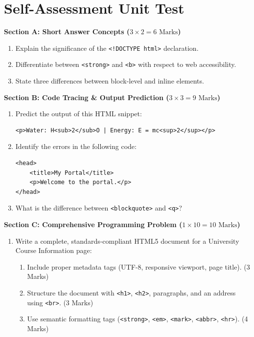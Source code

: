 \section{Self-Assessment Unit Test}

\begin{chaptertest}
\noindent\textbf{Section A: Short Answer Concepts ($3 \times 2 = 6\text{ Marks}$)}
\begin{enumerate}
    \item Explain the significance of the \texttt{<!DOCTYPE html>} declaration.
    \item Differentiate between \texttt{<strong>} and \texttt{<b>} with respect to web accessibility.
    \item State three differences between block-level and inline elements.
\end{enumerate}

\medskip
\noindent\textbf{Section B: Code Tracing \& Output Prediction ($3 \times 3 = 9\text{ Marks}$)}
\begin{enumerate}[start=4]
    \item Predict the output of this HTML snippet:
    \begin{lstlisting}[language=HTML5]
<p>Water: H<sub>2</sub>O | Energy: E = mc<sup>2</sup></p>
    \end{lstlisting}
    \item Identify the errors in the following code:
    \begin{lstlisting}[language=HTML5]
<head>
    <title>My Portal</title>
    <p>Welcome to the portal.</p>
</head>
    \end{lstlisting}
    \item What is the difference between \texttt{<blockquote>} and \texttt{<q>}?
\end{enumerate}

\medskip
\noindent\textbf{Section C: Comprehensive Programming Problem ($1 \times 10 = 10\text{ Marks}$)}
\begin{enumerate}[start=7]
    \item Write a complete, standards-compliant HTML5 document for a University Course Information page:
    \begin{enumerate}[label=(\alph*)]
        \item Include proper metadata tags (UTF-8, responsive viewport, page title). (3 Marks)
        \item Structure the document with \texttt{<h1>}, \texttt{<h2>}, paragraphs, and an address using \texttt{<br>}. (3 Marks)
        \item Use semantic formatting tags (\texttt{<strong>}, \texttt{<em>}, \texttt{<mark>}, \texttt{<abbr>}, \texttt{<hr>}). (4 Marks)
    \end{enumerate}
\end{enumerate}
\end{chaptertest}

